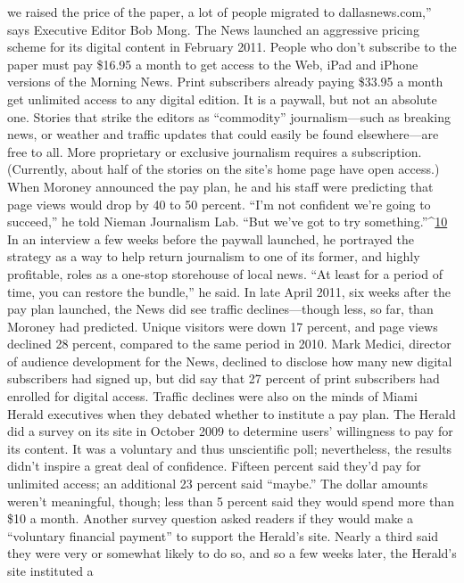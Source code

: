 we raised the price of the paper, a lot of people migrated to dallasnews.com,'' says
Executive Editor Bob Mong.
The News launched an aggressive pricing scheme for its digital content in
February 2011. People who don’t subscribe to the paper must pay \$16.95 a
month to get access to the Web, iPad and iPhone versions of the Morning News.
Print subscribers already paying \$33.95 a month get unlimited access to any
digital edition.
It is a paywall, but not an absolute one. Stories that strike the editors as ``commodity''
journalism—such as breaking news, or weather and traffic updates that
could easily be found elsewhere—are free to all. More proprietary or exclusive
journalism requires a subscription. (Currently, about half of the stories on the
site’s home page have open access.)
When Moroney announced the pay plan, he and his staff were predicting that
page views would drop by 40 to 50 percent. ``I’m not confident we’re going to
succeed,'' he told Nieman Journalism Lab. ``But we’ve got to try something.''^{\href{#endnotes-ch5}{10 }}In
an interview a few weeks before the paywall launched, he portrayed the strategy
as a way to help return journalism to one of its former, and highly profitable,
roles as a one-stop storehouse of local news. ``At least for a period of time, you
can restore the bundle,'' he said.
In late April 2011, six weeks after the pay plan launched, the News did see
traffic declines—though less, so far, than Moroney had predicted. Unique visitors
were down 17 percent, and page views declined 28 percent, compared to the
same period in 2010. Mark Medici, director of audience development for the
News, declined to disclose how many new digital subscribers had signed up, but
did say that 27 percent of print subscribers had enrolled for digital access.
Traffic declines were also on the minds of Miami Herald executives when they
debated whether to institute a pay plan.
The Herald did a survey on its site in October 2009 to determine users’ willingness
to pay for its content. It was a voluntary and thus unscientific poll; nevertheless,
the results didn’t inspire a great deal of confidence. Fifteen percent said
they’d pay for unlimited access; an additional 23 percent said ``maybe.'' The dollar
amounts weren’t meaningful, though; less than 5 percent said they would spend
more than \$10 a month.
Another survey question asked readers if they would make a ``voluntary financial
payment'' to support the Herald’s site. Nearly a third said they were very or
somewhat likely to do so, and so a few weeks later, the Herald’s site instituted a
